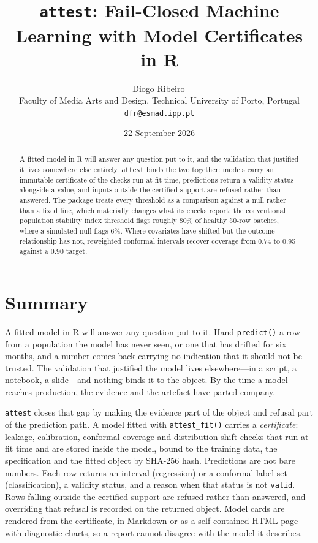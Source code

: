 \documentclass[11pt,a4paper]{article}
\title{\texttt{attest}: Fail-Closed Machine Learning with Model
Certificates in \textsf{R}}
\author{%
  Diogo Ribeiro\,\orcidlink{0009-0001-2022-7072}\\[2pt]
  \small Faculty of Media Arts and Design, Technical University of Porto,
  Portugal\\
  \small \texttt{dfr@esmad.ipp.pt}
}
\date{22 September 2026}
\begin{document}
\maketitle

\begin{abstract}
A fitted model in \textsf{R} will answer any question put to it, and the
validation that justified it lives somewhere else entirely. \texttt{attest}
binds the two together: models carry an immutable certificate of the checks
run at fit time, predictions return a validity status alongside a value, and
inputs outside the certified support are refused rather than answered. The
package treats every threshold as a comparison against a null rather than a
fixed line, which materially changes what its checks report: the conventional
population stability index threshold flags roughly 80\% of healthy 50-row
batches, where a simulated null flags 6\%. Where covariates have shifted but
the outcome relationship has not, reweighted conformal intervals recover
coverage from 0.74 to 0.95 against a 0.90 target.
\end{abstract}

\section{Summary}

A fitted model in \textsf{R} will answer any question put to it. Hand
\texttt{predict()} a row from a population the model has never seen, or one
that has drifted for six months, and a number comes back carrying no
indication that it should not be trusted. The validation that justified the
model lives elsewhere---in a script, a notebook, a slide---and nothing binds
it to the object. By the time a model reaches production, the evidence and the
artefact have parted company.

\texttt{attest} closes that gap by making the evidence part of the object and
refusal part of the prediction path. A model fitted with \texttt{attest\_fit()}
carries a \emph{certificate}: leakage, calibration, conformal coverage and
distribution-shift checks that run at fit time and are stored inside the model,
bound to the training data, the specification and the fitted object by SHA-256
hash. Predictions are not bare numbers. Each row returns an interval
(regression) or a conformal label set (classification), a validity status, and
a reason when that status is not \texttt{valid}. Rows falling outside the
certified support are refused rather than answered, and overriding that refusal
is recorded on the returned object. Model cards are rendered from the
certificate, in Markdown or as a self-contained HTML page with diagnostic
charts, so a report cannot disagree with the model it describes.
\end{document}
